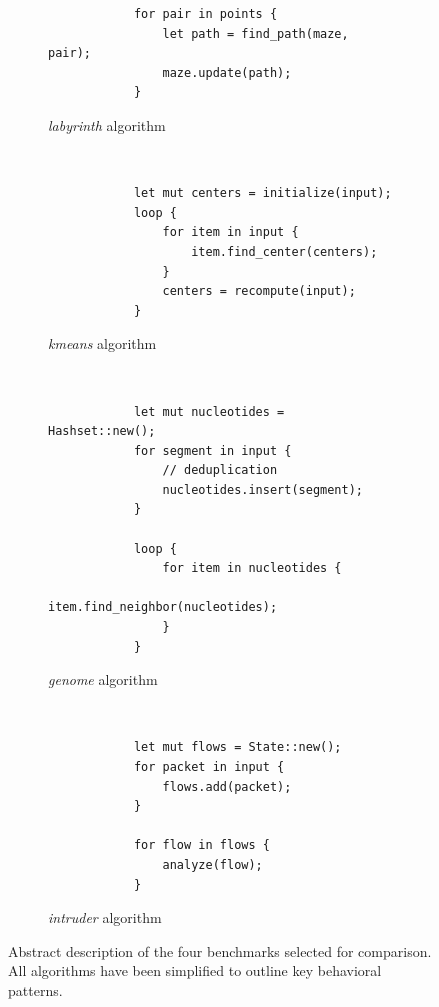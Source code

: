 \begin{figure}
    \begin{subfigure}[b]{.48\textwidth}
        \begin{verbatim}
            for pair in points {
                let path = find_path(maze, pair);
                maze.update(path);
            }
        \end{verbatim}
        \caption{\emph{labyrinth} algorithm}
        \label{fig:experiments:opportunities:algos:labyrinth}
    \end{subfigure}
    ~
    \begin{subfigure}[b]{.48\textwidth}
        \begin{verbatim}
            let mut centers = initialize(input);
            loop {
                for item in input {
                    item.find_center(centers);
                }
                centers = recompute(input);
            }
        \end{verbatim}
        \caption{\emph{kmeans} algorithm}
        \label{fig:experiments:opportunities:algos:kmeans}
    \end{subfigure}
    \vspace*{.5cm}
    \begin{subfigure}[b]{.48\textwidth}
        \ \\
        \begin{verbatim}
            let mut nucleotides = Hashset::new();
            for segment in input {
                // deduplication
                nucleotides.insert(segment);
            }

            loop {
                for item in nucleotides {
                    item.find_neighbor(nucleotides);
                }
            }
        \end{verbatim}
        \caption{\emph{genome} algorithm}
        \label{fig:experiments:opportunities:algos:genome}
    \end{subfigure}
    ~
    \begin{subfigure}[b]{.48\textwidth}
        \begin{verbatim}
            let mut flows = State::new();
            for packet in input {
                flows.add(packet);
            }

            for flow in flows {
                analyze(flow);
            }
        \end{verbatim}
        \caption{\emph{intruder} algorithm}
        \label{fig:experiments:opportunities:algos:intruder}
    \end{subfigure}
    \caption{Abstract description of the four benchmarks selected for comparison. All algorithms have been simplified to outline key behavioral patterns.}
    \label{fig:experiments:opportunities:algos}
\end{figure}

